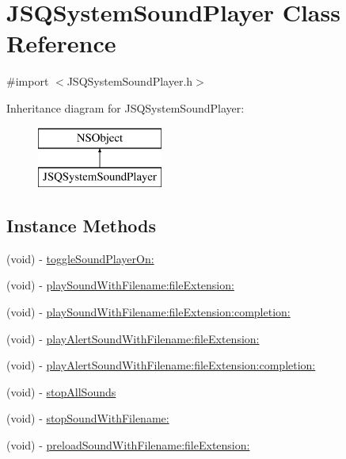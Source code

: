 \hypertarget{interface_j_s_q_system_sound_player}{}\section{J\+S\+Q\+System\+Sound\+Player Class Reference}
\label{interface_j_s_q_system_sound_player}


{\ttfamily \#import $<$J\+S\+Q\+System\+Sound\+Player.\+h$>$}

Inheritance diagram for J\+S\+Q\+System\+Sound\+Player\+:\begin{figure}[H]
\begin{center}
\leavevmode
\includegraphics[height=2.000000cm]{interface_j_s_q_system_sound_player}
\end{center}
\end{figure}
\subsection*{Instance Methods}
\begin{DoxyCompactItemize}
\item 
(void) -\/ \hyperlink{interface_j_s_q_system_sound_player_afb71d72c35b2b9b26974947ab3d5ee70}{toggle\+Sound\+Player\+On\+:}
\item 
(void) -\/ \hyperlink{interface_j_s_q_system_sound_player_a4c84bb7a42d6e989b6cbfc84cf2725b2}{play\+Sound\+With\+Filename\+:file\+Extension\+:}
\item 
(void) -\/ \hyperlink{interface_j_s_q_system_sound_player_aea0ee1756925854dc1a3eaceacce3bc5}{play\+Sound\+With\+Filename\+:file\+Extension\+:completion\+:}
\item 
(void) -\/ \hyperlink{interface_j_s_q_system_sound_player_a771fb3f532c6e7a62ad78a1d2dd53015}{play\+Alert\+Sound\+With\+Filename\+:file\+Extension\+:}
\item 
(void) -\/ \hyperlink{interface_j_s_q_system_sound_player_a16516a244af3b76e8036052565de07a2}{play\+Alert\+Sound\+With\+Filename\+:file\+Extension\+:completion\+:}
\item 
(void) -\/ \hyperlink{interface_j_s_q_system_sound_player_a4230aae8c171b62415026374cb513660}{stop\+All\+Sounds}
\item 
(void) -\/ \hyperlink{interface_j_s_q_system_sound_player_afed4bc00952d56e5111533e574f56f6b}{stop\+Sound\+With\+Filename\+:}
\item 
(void) -\/ \hyperlink{interface_j_s_q_system_sound_player_ab6be31eefeb86bd1d6498adfb755c995}{preload\+Sound\+With\+Filename\+:file\+Extension\+:}
\end{DoxyCompactItemize}
